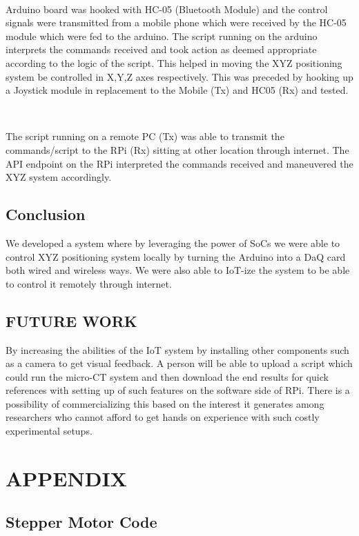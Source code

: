 \documentclass[MTech]{iitmdiss}
\begin{document}
\

\noindent Arduino board was hooked with HC-05 (Bluetooth Module) and the control signals were transmitted from a mobile phone which were received by the HC-05 module which were fed to the arduino. The script running on the arduino interprets the commands received and took action as deemed appropriate according to the logic of the script. This helped in moving the XYZ positioning system be controlled in X,Y,Z axes respectively. This was preceded by hooking up a Joystick module in replacement to the Mobile (Tx) and HC05 (Rx) and tested.

\

\noindent The script running on a remote PC (Tx) was able to transmit the commands/script to the RPi (Rx) sitting at other location through internet. The API endpoint on the RPi interpreted the commands received and maneuvered the XYZ system accordingly.

\section{Conclusion}

We developed a system where by leveraging the power of SoCs we were able to control XYZ positioning system locally by turning the Arduino into a DaQ card both wired and wireless ways. We were also able to IoT-ize the system to be able to control it remotely through internet.

\section{FUTURE WORK}

By increasing the abilities of the IoT system by installing other components such as a camera to get visual feedback. A person will be able to upload a script which could run the micro-CT system and then download the end results for quick references with setting up of such features on the software side of RPi. There is a possibility of commercializing this based on the interest it generates among researchers who cannot afford to get hands on experience with such costly experimental setups.



\appendix

\chapter{APPENDIX}

\section{Stepper Motor Code}
\label{sec:code1}
\end{document}
